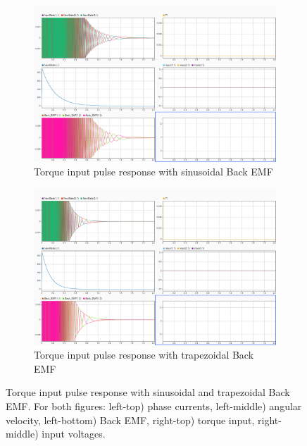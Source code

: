 \documentclass[]{report}
\begin{document}
\begin{figure} [H]
	\centering
	\begin{subfigure}{0.80\textwidth}
		\centering
		\includegraphics[width=\textwidth]{Matlab/TorqueInputPulse_SinusoidalBackEMF.png}
		\caption{Torque input pulse response with sinusoidal Back EMF}
		\label{fig:TorqueInputResponseSinusoidal}
	\end{subfigure}
	\hfill
	\begin{subfigure}{0.80\textwidth}
		\centering
		\includegraphics[width=\textwidth]{Matlab/TorqueInputPulse_TrapezoidalBackEMF.png}
		\caption{Torque input pulse response with trapezoidal Back EMF}
		\label{fig:TorqueInputResponseTrapezoidal}
	\end{subfigure}
	\caption{Torque input pulse response with sinusoidal and trapezoidal Back EMF. For both figures: left-top) phase currents, left-middle) angular velocity, left-bottom) Back EMF, right-top) torque input, right-middle) input voltages.}
	\label{fig:TorqueInputResponse}
\end{figure}
\end{document}
